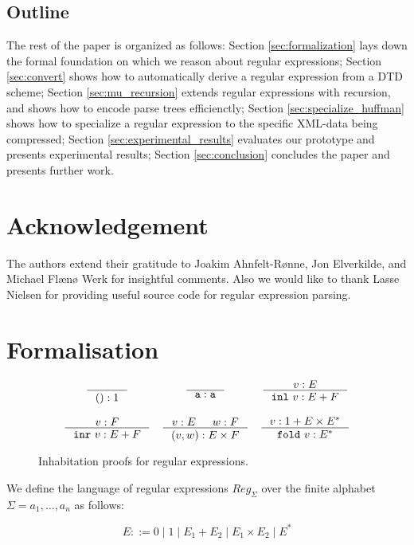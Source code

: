 \documentclass[a4paper, oneside]{memoir}
\theoremstyle{definition}
\begin{document}
\subsection{Outline}

The rest of the paper is organized as follows:
Section \ref{sec:formalization} lays down the formal foundation on which we reason about regular expressions;
Section \ref{sec:convert} shows how to automatically derive a regular expression from a DTD scheme;
Section \ref{sec:mu_recursion} extends regular expressions with recursion, and shows how to encode parse trees efficienctly;
Section \ref{sec:specialize_huffman} shows how to specialize a regular expression to the specific XML-data being compressed;
Section \ref{sec:experimental_results} evaluates our prototype and presents experimental results;
Section \ref{sec:conclusion} concludes the paper and presents further work.

\section{Acknowledgement}

The authors extend their gratitude to Joakim Ahnfelt-Rønne, Jon Elverkilde, and
Michael Flænø Werk for insightful comments. Also we would like to thank Lasse
Nielsen for providing useful source code for regular expression parsing.

\section{Formalisation}
\label{sec:formalisation}

\begin{figure}
\[
\begin{array}{ccc}
  \inference{}{() : 1}
&
  \inference{}{\texttt{a} : \texttt{a}}
&
  \inference{v : E}{\mathtt{inl}\ v : E + F}
\\
\\
  \inference{v : F}{\mathtt{inr}\ v : E + F}
&
  \inference{v : E & w : F}{(v, w) : E \times F}
&
  \inference{v : 1 + E \times E^{\ast}}{\mathtt{fold}\ v : E^{\ast}}
\end{array}
\]
\caption{Inhabitation proofs for regular expressions.}
\label{fig:inhabitation_proofs}
\end{figure}

We define the language of regular expressions $Reg_\Sigma$ over the finite
alphabet $\Sigma = {a_1, \dots, a_n}$ as follows:

\[
    E ::= 0 \; | \; 1 \; | \; E_1 + E_2 \; | \; E_1 \times E_2 \; | \; E^{*}
\]
\end{document}
